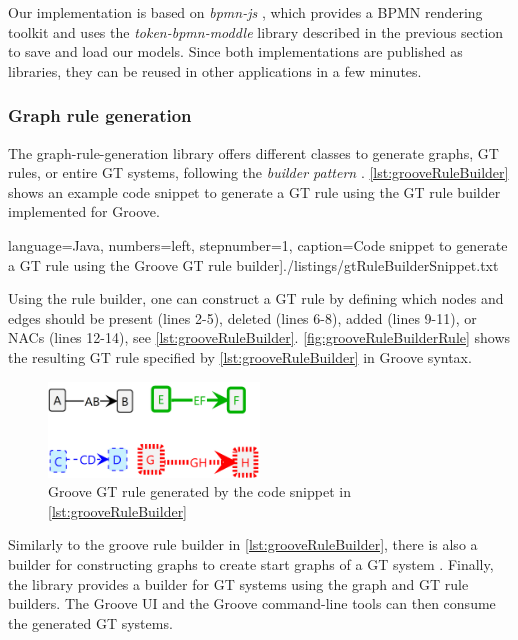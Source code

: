\documentclass{lmcs} %
\begin{document}
Our implementation is based on \textit{bpmn-js} \cite{camundaservicesgmbhBpmnjs2023}, which provides a BPMN rendering toolkit and uses the \textit{token-bpmn-moddle} library described in the previous section to save and load our models.
Since both implementations are published as libraries, they can be reused in other applications in a few minutes.

\subsubsection{Graph rule generation}
The graph-rule-generation library offers different classes to generate graphs, GT rules, or entire GT systems, following the \textit{builder pattern} \cite{gammaDesignPatternsElements1995}.
\autoref{lst:grooveRuleBuilder} shows an example code snippet to generate a GT rule using the GT rule builder implemented for Groove.

 language=Java, numbers=left,
    stepnumber=1, caption=Code snippet to generate a GT rule using the Groove GT rule builder]{./listings/gtRuleBuilderSnippet.txt}

Using the rule builder, one can construct a GT rule by defining which nodes and edges should be present (lines 2-5), deleted (lines 6-8), added (lines 9-11), or NACs (lines 12-14), see \autoref{lst:grooveRuleBuilder}.
\autoref{fig:grooveRuleBuilderRule} shows the resulting GT rule specified by \autoref{lst:grooveRuleBuilder} in Groove syntax.

\begin{figure}[ht]
    \centering
    \includegraphics[width=0.5\textwidth]{images/rule.png}
    \caption{Groove GT rule generated by the code snippet in \autoref{lst:grooveRuleBuilder}}
    \label{fig:grooveRuleBuilderRule}
\end{figure}

Similarly to the groove rule builder in \autoref{lst:grooveRuleBuilder}, there is also a builder for constructing graphs to create start graphs of a GT system \cite{timkrauterLMCS2024Artifacts2023}.
Finally, the library provides a builder for GT systems using the graph and GT rule builders.
The Groove UI and the Groove command-line tools can then consume the generated GT systems.
\end{document}
